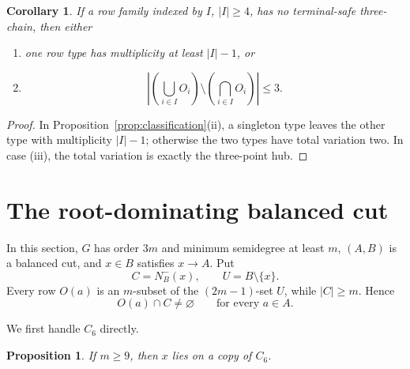 \documentclass[11pt]{amsart}
\newtheorem{proposition}[theorem]{Proposition}
\newtheorem{corollary}[theorem]{Corollary}
\theoremstyle{definition}
\begin{document}
\begin{corollary}\label{cor:stability}
If a row family indexed by $I$, $|I|\ge4$, has no terminal-safe three-chain, then either
\begin{enumerate}
\item one row type has multiplicity at least $|I|-1$, or
\item
\[
  \left|\left(\bigcup_{i\in I}O_i\right)
  \setminus\left(\bigcap_{i\in I}O_i\right)\right|\le3.
\]
\end{enumerate}
\end{corollary}

\begin{proof}
In Proposition~\ref{prop:classification}(ii), a singleton type leaves the other type with multiplicity $|I|-1$; otherwise the two types have total variation two.  In case (iii), the total variation is exactly the three-point hub.
\end{proof}

\section{The root-dominating balanced cut}\label{sec:first-port}

In this section, $G$ has order $3m$ and minimum semidegree at least $m$, $(A,B)$ is a balanced cut, and $x\in B$ satisfies $x\to A$.  Put
\[
  C=N_B^-(x),\qquad U=B\setminus\{x\}.
\]
Every row $O(a)$ is an $m$-subset of the $(2m-1)$-set $U$, while $|C|\ge m$.  Hence
\begin{equation}\label{eq:row-meets-C}
  O(a)\cap C\ne\varnothing
  \qquad\text{for every }a\in A.
\end{equation}

We first handle $C_6$ directly.

\begin{proposition}\label{prop:first-C6}
If $m\ge9$, then $x$ lies on a copy of $C_6$.
\end{proposition}
\end{document}
